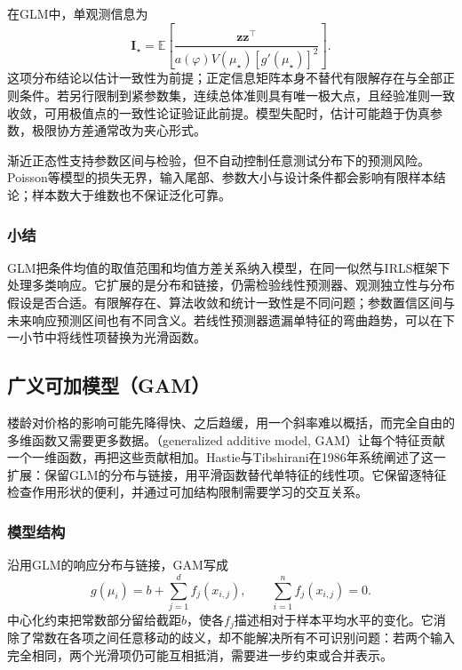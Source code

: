 在GLM中，单观测信息为
\[
 \bm I_\star
 =\mathbb E\!\left[
 \frac{\bm z\bm z^\top}
 {a(\varphi)V(\mu_\star)[g'(\mu_\star)]^2}\right].
\]
这项分布结论以估计一致性为前提；正定信息矩阵本身不替代有限解存在与全部正则条件。若另行限制到紧参数集，连续总体准则具有唯一极大点，且经验准则一致收敛，可用极值点的一致性论证验证此前提。模型失配时，估计可能趋于伪真参数，极限协方差通常改为夹心形式。

渐近正态性支持参数区间与检验，但不自动控制任意测试分布下的预测风险。Poisson等模型的损失无界，输入尾部、参数大小与设计条件都会影响有限样本结论；样本数大于维数也不保证泛化可靠。

\subsubsection{小结}

GLM把条件均值的取值范围和均值方差关系纳入模型，在同一似然与IRLS框架下处理多类响应。它扩展的是分布和链接，仍需检验线性预测器、观测独立性与分布假设是否合适。有限解存在、算法收敛和统计一致性是不同问题；参数置信区间与未来响应预测区间也有不同含义。若线性预测器遗漏单特征的弯曲趋势，可以在下一小节中将线性项替换为光滑函数。

\subsection{广义可加模型（GAM）}
\label{sec:regression-gam}

楼龄对价格的影响可能先降得快、之后趋缓，用一个斜率难以概括，而完全自由的多维函数又需要更多数据。（generalized additive model, GAM）让每个特征贡献一个一维函数，再把这些贡献相加。Hastie与Tibshirani在1986年系统阐述了这一扩展：保留GLM的分布与链接，用平滑函数替代单特征的线性项。它保留逐特征检查作用形状的便利，并通过可加结构限制需要学习的交互关系。

\subsubsection{模型结构}

沿用GLM的响应分布与链接，GAM写成
\begin{equation}
  g(\mu_i)=b+\sum_{j=1}^{d}f_j(x_{i,j}),
  \qquad \sum_{i=1}^{n}f_j(x_{i,j})=0.
  \label{eq:regression-gam}
\end{equation}
中心化约束把常数部分留给截距$b$，使各$f_j$描述相对于样本平均水平的变化。它消除了常数在各项之间任意移动的歧义，却不能解决所有不可识别问题：若两个输入完全相同，两个光滑项仍可能互相抵消，需要进一步约束或合并表示。

